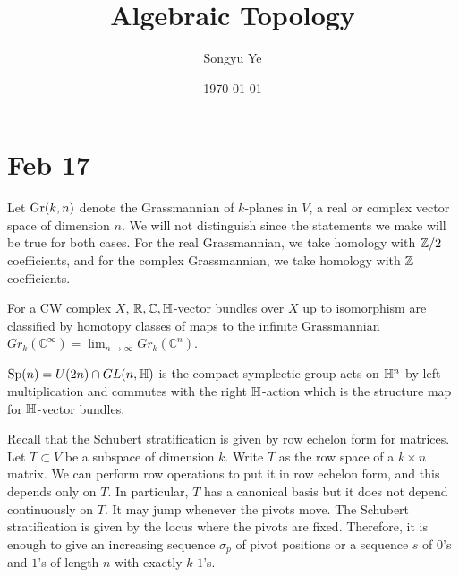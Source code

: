 \documentclass[12pt]{article}
\begin{document}
\rhead{\today}
\cfoot{\thepage}

\title{Algebraic Topology}

\author{Songyu Ye}
\date{\today}
\maketitle


\begin{abstract}

\end{abstract}

\tableofcontents

\section{Feb 17}
Let $\operatorname{Gr}(k,n)$ denote the Grassmannian of $k$-planes in $V$, a real or complex vector space of dimension $n$. We will not distinguish since the statements we make will be true for both cases. For the real Grassmannian, we take homology with $\mathbb{Z}/2$ coefficients, and for the complex Grassmannian, we take homology with $\mathbb{Z}$ coefficients.
\begin{theorem} 
    For a CW complex $X$, $\mathbb{R}, \mathbb{C}, \mathbb{H}$-vector bundles over $X$ up to isomorphism are classified by homotopy classes of maps to the infinite Grassmannian $Gr_k(\mathbb{C}^\infty) = \lim_{n\to\infty} Gr_k(\mathbb{C}^n)$.
\end{theorem}

\begin{remark}
    $\operatorname{Sp}(n) = U(2n) \cap GL(n, \mathbb{H})$ is the compact symplectic group acts on $\mathbb{H}^n$ by left multiplication and commutes with the right $\mathbb{H}$-action which is the structure map for $\mathbb{H}$-vector bundles. 
\end{remark}
Recall that the Schubert stratification is given by row echelon form for matrices. Let $T\subset V$ be a subspace of dimension $k$. Write $T$ as the row space of a $k\times n$ matrix. We can perform row operations to put it in row echelon form, and this depends only on $T$. In particular, $T$ has a canonical basis but it does not depend continuously on $T$. It may jump whenever the pivots move. The Schubert stratification is given by the locus where the pivots are fixed. Therefore, it is enough to give an increasing sequence $\sigma_p$ of pivot positions or a sequence $s$ of $0$'s and $1$'s of length $n$ with exactly $k$ $1$'s. 
\end{document}
